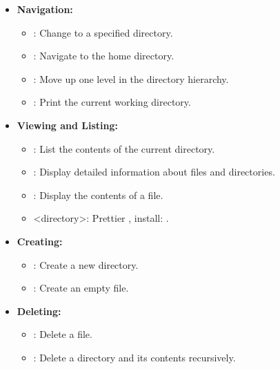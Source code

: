 \begin{Def}
	
	\begin{itemize}
		\item \textbf{Navigation:}
		      \begin{itemize}
			      \item {}: Change to a specified directory.
			      \item {}: Navigate to the home directory.
			      \item {}: Move up one level in the directory hierarchy.
			      \item {}: Print the current working directory.
		      \end{itemize}

		\item \textbf{Viewing and Listing:}
		      \begin{itemize}
			      \item {}: List the contents of the current directory.
			      \item {}: Display detailed information about files and directories.
			      \item {}: Display the contents of a file.
			      \item \colorbox{OliveGreen!20}{ <directory>}:
				  Prettier , install: \colorbox{OliveGreen!20}{}.
		      \end{itemize}

		\item \textbf{Creating:}
		      \begin{itemize}
			      \item {}: Create a new directory.
			      \item {}: Create an empty file.
		      \end{itemize}

		\item \textbf{Deleting:}
		      \begin{itemize}
			      \item {}: Delete a file.
			      \item {}: Delete a directory and its contents recursively.
		      \end{itemize}


\end{itemize}
\end{Def}
